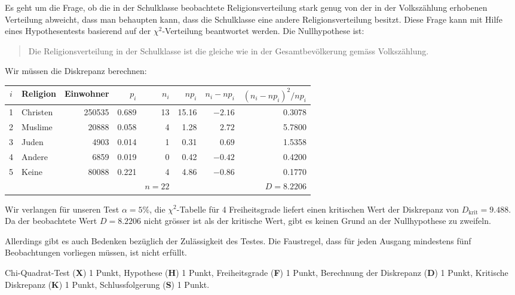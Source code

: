 \begin{loesung}
Es geht um die Frage, ob die in der Schulklasse beobachtete Religionsverteilung
stark genug von der in der Volkszählung erhobenen Verteilung abweicht,
dass man behaupten kann, dass die Schulklasse eine andere Religionsverteilung
besitzt.
Diese Frage kann mit Hilfe eines Hypothesentests basierend auf der
$\chi^2$-Verteilung beantwortet werden. Die Nullhypothese ist:
\begin{quotation}
\parindent 0pt
Die Religionsverteilung in der Schulklasse ist die gleiche wie in
der Gesamtbevölkerung gemäss Volkszählung.
\end{quotation}
Wir müssen die Diskrepanz berechnen:
\begin{center}
\begin{tabular}{|c|l|r|r|r|r|r|r|}
\hline
$i$&Religion&Einwohner&$p_i$   &$n_i$&$np_i$    &$n_i-np_i$&$(n_i-np_i)^2/np_i$\\
\hline
1  &Christen&   250535&0.689   &   13&15.16   &$-2.16   $&0.3078\\
2  & Muslime&    20888&0.058   &    4& 1.28   &$ 2.72   $&5.7800\\
3  &   Juden&     4903&0.014   &    1& 0.31   &$ 0.69   $&1.5358\\
4  &  Andere&     6859&0.019   &    0& 0.42   &$-0.42   $&0.4200\\
5  &   Keine&    80088&0.221   &    4& 4.86   &$-0.86   $&0.1770\\
\hline
   &        &         &        &$n=22$&       &        &$D=8.2206$\\
\hline
\end{tabular}
\end{center}
Wir verlangen für unseren Test $\alpha=5\%$, die $\chi^2$-Tabelle
für 4 Freiheitsgrade liefert einen kritischen Wert der Diskrepanz
von $D_{\text{krit}}=9.488$. Da der beobachtete Wert $D=8.2206$
nicht grösser ist als der kritische Wert, gibt es keinen Grund an
der Nullhypothese zu zweifeln.

Allerdings gibt es auch Bedenken bezüglich der Zulässigkeit des
Testes.
Die Faustregel, dass für jeden Ausgang mindestens
fünf Beobachtungen vorliegen müssen, ist nicht erfüllt.
\end{loesung}

\begin{bewertung}
Chi-Quadrat-Test ({\bf X}) 1 Punkt,
Hypothese ({\bf H}) 1 Punkt,
Freiheitsgrade ({\bf F}) 1 Punkt,
Berechnung der Diskrepanz ({\bf D}) 1 Punkt,
Kritische Diskrepanz ({\bf K}) 1 Punkt,
Schlussfolgerung ({\bf S}) 1 Punkt.
\end{bewertung}
